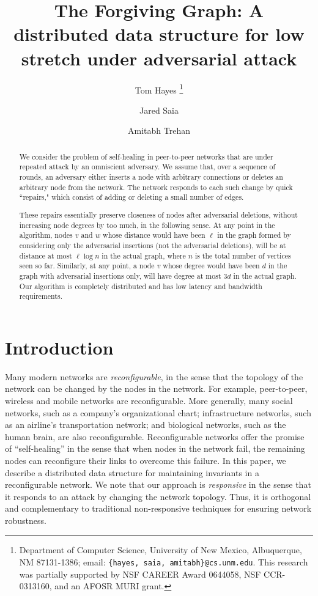 \documentclass[11pt, letter]{article}
\title{The Forgiving Graph: A distributed data structure for low stretch under adversarial attack}
\author{Tom Hayes \thanks{Department of Computer Science,  
University of New Mexico,  Albuquerque,  NM 87131-1386;
email: {\tt \{hayes, saia, amitabh\}@cs.unm.edu}. 
This research was partially supported by NSF CAREER Award 0644058,
NSF CCR-0313160, and an AFOSR MURI grant.}
\and Jared Saia   \footnotemark[1]
\and Amitabh Trehan  \footnotemark[1] }
\begin{document}
\date{}
\maketitle

\thispagestyle{empty}

\begin{abstract}
We consider the problem of self-healing in peer-to-peer networks that are under repeated attack by an omniscient
adversary. We assume that, over a sequence of rounds, an adversary either inserts a node with arbitrary connections or
deletes an arbitrary node from the network. The network responds to each such change by quick ``repairs," which consist
of adding or deleting a small number of edges.

These repairs essentially preserve closeness of nodes after adversarial deletions, without increasing node degrees by
too much, in the following sense.   At any point in the algorithm, nodes $v$ and $w$ whose distance would have been $\ell$ in the graph formed by considering only the adversarial insertions (not the adversarial deletions), will be at
distance at most $\ell \log n$ in the actual graph, where $n$ is the total number of vertices seen so far. Similarly, at any
point, a node $v$ whose degree would have been $d$ in the graph with adversarial insertions only, will have degree at most
$3d$ in the actual graph.  Our algorithm is completely distributed and has low latency and bandwidth requirements.

\end{abstract}

\section{Introduction}

Many modern networks are \emph{reconfigurable}, in the sense that the topology of the network can be changed by the
nodes in the network.  For example, peer-to-peer, wireless and mobile networks are reconfigurable.  More generally, many social networks, such as a company's organizational chart; infrastructure networks, such as an airline's transportation network; and biological networks, such as the human brain, are also reconfigurable.  Reconfigurable networks offer the promise of ``self-healing'' in the sense that when nodes in the network fail, the remaining nodes can reconfigure their links to overcome this failure.  In this paper, we describe a distributed data structure for maintaining invariants in a reconfigurable network.  We note that our approach is \emph{responsive} in the sense that it responds to an attack by changing the network topology.  Thus, it is orthogonal and complementary to traditional non-responsive techniques for ensuring network robustness.
\end{document}
